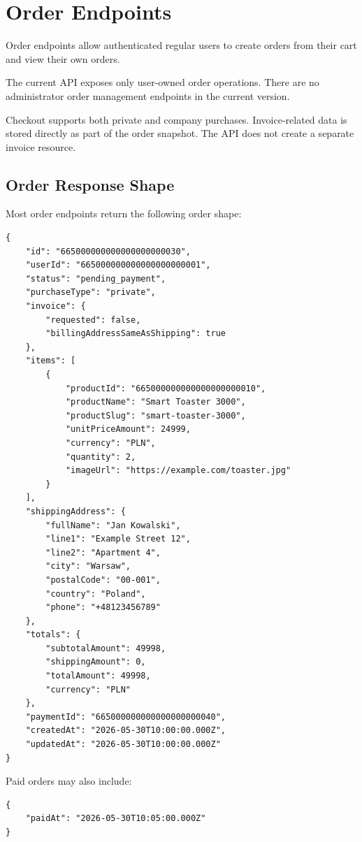 \section{Order Endpoints}

Order endpoints allow authenticated regular users to create orders from their cart and view their own orders.

The current API exposes only user-owned order operations. There are no administrator order management endpoints in the current version.

Checkout supports both private and company purchases. Invoice-related data is stored directly as part of the order snapshot. The API does not create a separate invoice resource.

\pagebreak
\subsection{Order Response Shape}

Most order endpoints return the following order shape:

\begin{verbatim}
{
    "id": "665000000000000000000030",
    "userId": "665000000000000000000001",
    "status": "pending_payment",
    "purchaseType": "private",
    "invoice": {
        "requested": false,
        "billingAddressSameAsShipping": true
    },
    "items": [
        {
            "productId": "665000000000000000000010",
            "productName": "Smart Toaster 3000",
            "productSlug": "smart-toaster-3000",
            "unitPriceAmount": 24999,
            "currency": "PLN",
            "quantity": 2,
            "imageUrl": "https://example.com/toaster.jpg"
        }
    ],
    "shippingAddress": {
        "fullName": "Jan Kowalski",
        "line1": "Example Street 12",
        "line2": "Apartment 4",
        "city": "Warsaw",
        "postalCode": "00-001",
        "country": "Poland",
        "phone": "+48123456789"
    },
    "totals": {
        "subtotalAmount": 49998,
        "shippingAmount": 0,
        "totalAmount": 49998,
        "currency": "PLN"
    },
    "paymentId": "665000000000000000000040",
    "createdAt": "2026-05-30T10:00:00.000Z",
    "updatedAt": "2026-05-30T10:00:00.000Z"
}
\end{verbatim}

\pagebreak
Paid orders may also include:

\begin{verbatim}
{
    "paidAt": "2026-05-30T10:05:00.000Z"
}
\end{verbatim}

